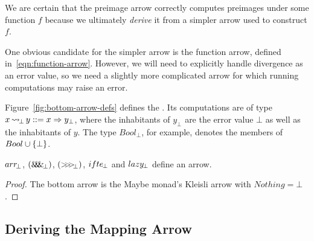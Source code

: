 \documentclass[preprint]{sigplanconf}
\newcommand{\arrow}{\rightsquigarrow}
\newcommand{\arrowarr}{\ensuremath{arr}}
\newcommand{\arrowcomp}{\ensuremath{{>}\mspace{-6mu}{>}\mspace{-6mu}{>}}}
\newcommand{\arrowpair}{\ensuremath{\mathit{\&\mspace{-7.5mu}\&\mspace{-7.5mu}\&}}}
\newcommand{\arrowif}{\ensuremath{ifte}}
\newcommand{\arrowlazy}{\ensuremath{lazy}}
\DeclareMathOperator{\botto}{\arrow_{\mspace{-3mu}\bot}}
\newcommand{\arrbot}{\arrowarr_{\mspace{-3mu}\bot}}
\newcommand{\compbot}{\arrowcomp_{\mspace{-5mu}\bot}}
\newcommand{\pairbot}{\arrowpair_{\mspace{-3mu}\bot}}
\newcommand{\ifbot}{\arrowif_{\mspace{-2mu}\bot}}
\newcommand{\lazybot}{\arrowlazy_{\mspace{-2mu}\bot}}
\begin{document}
We are certain that the preimage arrow correctly computes preimages under some function $f$ because we ultimately \emph{derive} it from a simpler arrow used to construct $f$.

One obvious candidate for the simpler arrow is the function arrow, defined in~\eqref{eqn:function-arrow}.
However, we will need to explicitly handle divergence as an error value, so we need a slightly more complicated arrow for which running computations may raise an error.

Figure~\ref{fig:bottom-arrow-defs} defines the .
Its computations are of type $x \botto y ::= x \tto y_\bot$, where the inhabitants of $y_\bot$ are the error value $\bot$ as well as the inhabitants of $y$. The type $Bool_\bot$, for example, denotes the members of $Bool \cup \{{\bot}\}$.

\begin{theorem}
$\arrbot$, $(\pairbot)$, $(\compbot)$, $\ifbot$ and $\lazybot$ define an arrow.
\end{theorem}
\begin{proof}
The bottom arrow is the Maybe monad's Kleisli arrow with $Nothing = \bot$.
\end{proof}

\subsection{Deriving the Mapping Arrow}
\end{document}
